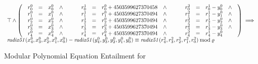 \begin{figure}
  \centering
  \[
  \begin{array}{l}
  \top \wedge
  \left(
  \begin{array}{lclcl}
    \begin{array}{rclc}
      {r}^0_0 & = & {x}^0_0 & \wedge \\
      {r}^0_1 & = & {x}^0_1 & \wedge \\
      {r}^0_2 & = & {x}^0_2 & \wedge \\
      {r}^0_3 & = & {x}^0_3 & \wedge \\
      {r}^0_4 & = & {x}^0_4 & \wedge \\
    \end{array}
    &\hspace{.01\textwidth}&
    \begin{array}{rclc}
      {r}^1_0 & = & {r}^0_0 + {4503599627370458} & \wedge \\
      {r}^1_1 & = & {r}^0_1 + {4503599627370494} & \wedge \\
      {r}^1_2 & = & {r}^0_2 + {4503599627370494} & \wedge \\
      {r}^1_3 & = & {r}^0_3 + {4503599627370494} & \wedge \\
      {r}^1_4 & = & {r}^0_4 + {4503599627370494} & \wedge\\
    \end{array}
    &\hspace{.01\textwidth}&
    \begin{array}{rclc}
      {r}^2_0 & = & {r}^1_0 - {y}^0_0 & \wedge \\
      {r}^2_1 & = & {r}^1_1 - {y}^0_1 & \wedge \\
      {r}^2_2 & = & {r}^1_2 - {y}^0_2 & \wedge \\
      {r}^2_3 & = & {r}^1_3 - {y}^0_3 & \wedge \\
      {r}^2_4 & = & {r}^1_4 - {y}^0_4
    \end{array}
  \end{array}
  \right) \implies \\
    \mathit{radix51}({x}^0_4, {x}^0_3, {x}^0_2, {x}^0_1, {x}^0_0) -
    \mathit{radix51}({y}^0_4, {y}^0_3, {y}^0_2, {y}^0_1, {y}^0_0)
    \equiv
    \mathit{radix51}({r}^2_4, {r}^2_3, {r}^2_2, {r}^2_1, {r}^2_0)
    \mod \myprime
  \end{array}
  \]
  \caption{Modular Polynomial Equation Entailment for }
  \label{figure:translation:subtraction-polynomial}
\end{figure}

